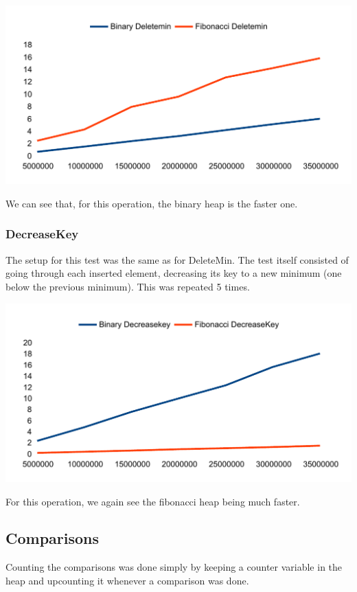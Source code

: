 \includegraphics[width=\textwidth]{graphs/deletemin_graph.pdf}

We can see that, for this operation, the binary heap is the faster one.

\subsubsection{DecreaseKey}
The setup for this test was the same as for DeleteMin. The test itself consisted of going through each inserted element, decreasing its key to a new minimum (one below the previous minimum). This was repeated 5 times.

\includegraphics[width=\textwidth]{graphs/decreasekey_graph.pdf}

For this operation, we again see the fibonacci heap being much faster.

\subsection{Comparisons}
Counting the comparisons was done simply by keeping a counter variable in the heap and upcounting it whenever a comparison was done.

